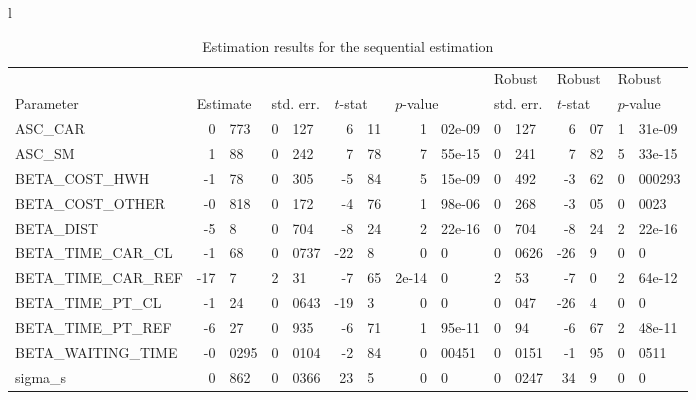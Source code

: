 \documentclass[12pt,a4paper]{article}
\begin{document}
 \begin{sidewaystable}[htb]
\caption{\label{tab:sequential}Estimation results for the sequential estimation}
  \begin{tabular}{l}
\begin{tabular}{lr@{.}lr@{.}lr@{.}lr@{.}lr@{.}lr@{.}lr@{.}l}
                      &   \multicolumn{2}{l}{}    & \multicolumn{2}{l}{} & \multicolumn{2}{l}{}  &     \multicolumn{2}{l}{} &   \multicolumn{2}{l}{Robust}    & \multicolumn{2}{l}{Robust}  &     \multicolumn{2}{l}{Robust}   \\
Parameter      & \multicolumn{2}{l}{Estimate}  &
\multicolumn{2}{l}{std. err.}  &  \multicolumn{2}{l}{$t$-stat}  &   \multicolumn{2}{l}{$p$-value}  &
\multicolumn{2}{l}{std. err.}  &  \multicolumn{2}{l}{$t$-stat}  &   \multicolumn{2}{l}{$p$-value}   \\
\hline
ASC\_CAR           &   0&773 &    0&127 &    6&11 & 1&02e-09 &         0&127 &         6&07 &      1&31e-09 \\
ASC\_SM            &    1&88 &    0&242 &    7&78 & 7&55e-15 &         0&241 &         7&82 &      5&33e-15 \\
BETA\_COST\_HWH     &   -1&78 &    0&305 &   -5&84 & 5&15e-09 &         0&492 &        -3&62 &      0&000293 \\
BETA\_COST\_OTHER   &  -0&818 &    0&172 &   -4&76 & 1&98e-06 &         0&268 &        -3&05 &        0&0023 \\
BETA\_DIST         &    -5&8 &    0&704 &   -8&24 & 2&22e-16 &         0&704 &        -8&24 &      2&22e-16 \\
BETA\_TIME\_CAR\_CL  &   -1&68 &   0&0737 &   -22&8 &      0&0 &        0&0626 &        -26&9 &           0&0 \\
BETA\_TIME\_CAR\_REF &   -17&7 &     2&31 &   -7&65 &  2e-14&0 &          2&53 &         -7&0 &      2&64e-12 \\
BETA\_TIME\_PT\_CL   &   -1&24 &   0&0643 &   -19&3 &      0&0 &         0&047 &        -26&4 &           0&0 \\
BETA\_TIME\_PT\_REF  &   -6&27 &    0&935 &   -6&71 & 1&95e-11 &          0&94 &        -6&67 &      2&48e-11 \\
BETA\_WAITING\_TIME & -0&0295 &   0&0104 &   -2&84 &  0&00451 &        0&0151 &        -1&95 &        0&0511 \\
sigma\_s           &   0&862 &   0&0366 &    23&5 &      0&0 &        0&0247 &         34&9 &           0&0 \\


\end{tabular}
\end{tabular}
\end{sidewaystable}
\end{document}
